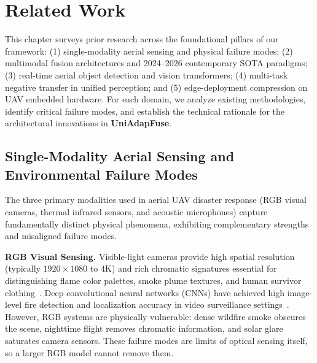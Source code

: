 
\section{Related Work}

This chapter surveys prior research across the foundational pillars of our framework: (1) single-modality aerial sensing and physical failure modes; (2) multimodal fusion architectures and 2024--2026 contemporary SOTA paradigms; (3) real-time aerial object detection and vision transformers; (4) multi-task negative transfer in unified perception; and (5) edge-deployment compression on UAV embedded hardware. For each domain, we analyze existing methodologies, identify critical failure modes, and establish the technical rationale for the architectural innovations in \textbf{UniAdapFuse}.

\subsection{Single-Modality Aerial Sensing and Environmental Failure Modes}

The three primary modalities used in aerial UAV disaster response (RGB visual cameras, thermal infrared sensors, and acoustic microphones) capture fundamentally distinct physical phenomena, exhibiting complementary strengths and misaligned failure modes.

\textbf{RGB Visual Sensing.}
Visible-light cameras provide high spatial resolution (typically $1920\times1080$ to $4\text{K}$) and rich chromatic signatures essential for distinguishing flame color palettes, smoke plume textures, and human survivor clothing~\cite{celik2009fire, toreyin2006computer}. Deep convolutional neural networks (CNNs) have achieved high image-level fire detection and localization accuracy in video surveillance settings~\cite{muhammad2019efficient}. However, RGB systems are physically vulnerable: dense wildfire smoke obscures the scene, nighttime flight removes chromatic information, and solar glare saturates camera sensors. These failure modes are limits of optical sensing itself, so a larger RGB model cannot remove them.

